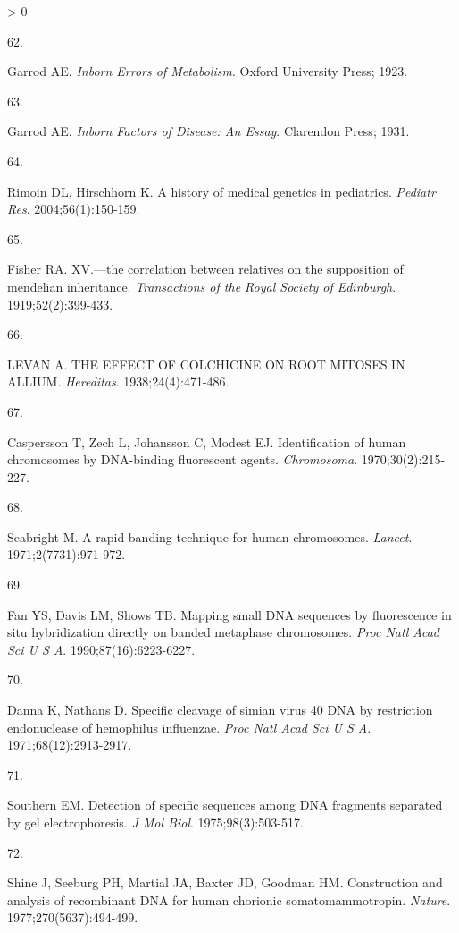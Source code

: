 \documentclass[11pt,letterpaper,oneside]{book}
\newlength{\cslhangindent}
\newlength{\csllabelwidth}
\newenvironment{CSLReferences}[3] %
 {%
  \setlength{\parindent}{0pt}
  \ifodd #1 \everypar{\setlength{\hangindent}{\cslhangindent}}\ignorespaces\fi
  \ifnum #2 > 0
  \setlength{\parskip}{#2\baselineskip}
  \fi
 }%
 {}
\newcommand{\CSLLeftMargin}[1]{\parbox[t]{\maxof{\widthof{#1}}{\csllabelwidth}}{#1}}
\newcommand{\CSLRightInline}[1]{\parbox[t]{\linewidth-\csllabelwidth}{#1}\newline}
\begin{document}
\begin{CSLReferences}{0}{0}
\leavevmode\hypertarget{ref-garrod:1923aa}{}%
\CSLLeftMargin{62. }
\CSLRightInline{Garrod AE. \emph{Inborn Errors of Metabolism}. Oxford University Press; 1923.}

\leavevmode\hypertarget{ref-garrod:1931aa}{}%
\CSLLeftMargin{63. }
\CSLRightInline{Garrod AE. \emph{Inborn Factors of Disease: An Essay}. Clarendon Press; 1931.}

\leavevmode\hypertarget{ref-rimoin:2004aa}{}%
\CSLLeftMargin{64. }
\CSLRightInline{Rimoin DL, Hirschhorn K. A history of medical genetics in pediatrics. \emph{Pediatr Res}. 2004;56(1):150-159.}

\leavevmode\hypertarget{ref-fisher:1919aa}{}%
\CSLLeftMargin{65. }
\CSLRightInline{Fisher RA. XV.---the correlation between relatives on the supposition of mendelian inheritance. \emph{Transactions of the Royal Society of Edinburgh}. 1919;52(2):399-433.}

\leavevmode\hypertarget{ref-levan:1938aa}{}%
\CSLLeftMargin{66. }
\CSLRightInline{LEVAN A. THE EFFECT OF COLCHICINE ON ROOT MITOSES IN ALLIUM. \emph{Hereditas}. 1938;24(4):471-486.}

\leavevmode\hypertarget{ref-caspersson:1970aa}{}%
\CSLLeftMargin{67. }
\CSLRightInline{Caspersson T, Zech L, Johansson C, Modest EJ. Identification of human chromosomes by DNA-binding fluorescent agents. \emph{Chromosoma}. 1970;30(2):215-227.}

\leavevmode\hypertarget{ref-seabright:1971aa}{}%
\CSLLeftMargin{68. }
\CSLRightInline{Seabright M. A rapid banding technique for human chromosomes. \emph{Lancet}. 1971;2(7731):971-972.}

\leavevmode\hypertarget{ref-fan:1990aa}{}%
\CSLLeftMargin{69. }
\CSLRightInline{Fan YS, Davis LM, Shows TB. Mapping small DNA sequences by fluorescence in situ hybridization directly on banded metaphase chromosomes. \emph{Proc Natl Acad Sci U S A}. 1990;87(16):6223-6227.}

\leavevmode\hypertarget{ref-danna:1971aa}{}%
\CSLLeftMargin{70. }
\CSLRightInline{Danna K, Nathans D. Specific cleavage of simian virus 40 DNA by restriction endonuclease of hemophilus influenzae. \emph{Proc Natl Acad Sci U S A}. 1971;68(12):2913-2917.}

\leavevmode\hypertarget{ref-southern:1975aa}{}%
\CSLLeftMargin{71. }
\CSLRightInline{Southern EM. Detection of specific sequences among DNA fragments separated by gel electrophoresis. \emph{J Mol Biol}. 1975;98(3):503-517.}

\leavevmode\hypertarget{ref-shine:1977aa}{}%
\CSLLeftMargin{72. }
\CSLRightInline{Shine J, Seeburg PH, Martial JA, Baxter JD, Goodman HM. Construction and analysis of recombinant DNA for human chorionic somatomammotropin. \emph{Nature}. 1977;270(5637):494-499.}


\end{CSLReferences}
\end{document}

